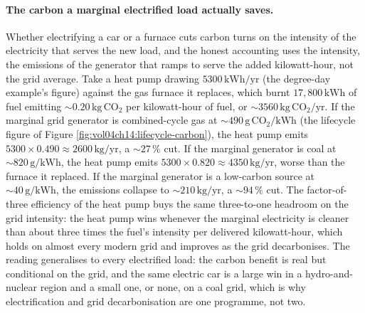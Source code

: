 \paragraph{The carbon a marginal electrified load actually saves.} Whether
electrifying a car or a furnace cuts carbon turns on the intensity of the
electricity that serves the new load, and the honest accounting uses the
 intensity, the emissions of the generator that ramps to
serve the added kilowatt-hour, not the grid average. Take a heat pump drawing
$5300\,\si{\kilo\watt\hour}/\text{yr}$ (the degree-day example's figure)
against the gas furnace it replaces, which burnt $17{,}800\,\si{\kilo\watt
\hour}$ of fuel emitting $\sim 0.20\,\si{\kilogram}\,\text{CO}_2$ per
kilowatt-hour of fuel, or $\sim 3560\,\si{\kilogram}\,\text{CO}_2/\text{yr}$.
If the marginal grid generator is combined-cycle gas at $\sim 490\,\si{\gram}
\,\text{CO}_2/\si{\kilo\watt\hour}$ (the lifecycle figure of Figure
\ref{fig:vol04ch14:lifecycle-carbon}), the heat pump emits $5300\times 0.490
\approx 2600\,\si{\kilogram}/\text{yr}$, a $\sim 27\,\%$ cut. If the marginal
generator is coal at $\sim 820\,\si{\gram}/\si{\kilo\watt\hour}$, the heat
pump emits $5300\times 0.820 \approx 4350\,\si{\kilogram}/\text{yr}$, worse
than the furnace it replaced. If the marginal generator is a low-carbon
source at $\sim 40\,\si{\gram}/\si{\kilo\watt\hour}$, the emissions collapse
to $\sim 210\,\si{\kilogram}/\text{yr}$, a $\sim 94\,\%$ cut. The factor-of-
three efficiency of the heat pump buys the same three-to-one headroom on the
grid intensity: the heat pump wins whenever the marginal electricity is
cleaner than about three times the fuel's intensity per delivered
kilowatt-hour, which holds on almost every modern grid and improves as the
grid decarbonises. The reading generalises to every electrified load: the
carbon benefit is real but conditional on the grid, and the same electric car
is a large win in a hydro-and-nuclear region and a small one, or none, on a
coal grid, which is why electrification and grid decarbonisation are one
programme, not two.

